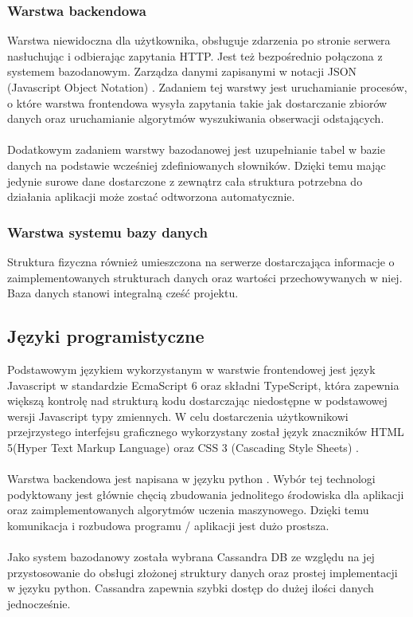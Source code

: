 \documentclass[eng,printmode]{mgr}
\begin{document}
\subsubsection{Warstwa backendowa}
Warstwa niewidoczna dla użytkownika, obsługuje zdarzenia po stronie serwera nasłuchując i odbierając zapytania HTTP. Jest też bezpośrednio połączona z systemem bazodanowym. Zarządza danymi zapisanymi w notacji JSON (Javascript Object Notation) \cite{JSON}. Zadaniem tej warstwy jest uruchamianie procesów, o które warstwa frontendowa wysyła zapytania takie jak dostarczanie zbiorów danych oraz uruchamianie algorytmów wyszukiwania obserwacji odstających.
\\\\
Dodatkowym zadaniem warstwy bazodanowej jest uzupełnianie tabel w bazie danych na podstawie wcześniej zdefiniowanych słowników. Dzięki temu mając jedynie surowe dane dostarczone z zewnątrz cała struktura potrzebna do działania aplikacji może zostać odtworzona automatycznie.
\subsubsection{Warstwa systemu bazy danych}
Struktura fizyczna również umieszczona na serwerze dostarczająca informacje o zaimplementowanych strukturach danych oraz wartości przechowywanych w niej. Baza danych stanowi integralną cześć projektu.
\subsection{Języki programistyczne}
Podstawowym językiem wykorzystanym w warstwie frontendowej jest język Javascript \cite{js} w standardzie EcmaScript 6 \cite{es6} oraz składni TypeScript\cite{ts}, która zapewnia większą kontrolę nad strukturą kodu dostarczając niedostępne w podstawowej wersji Javascript typy zmiennych. W celu dostarczenia użytkownikowi przejrzystego interfejsu graficznego wykorzystany został język znaczników HTML 5(Hyper Text Markup Language)\cite{html} oraz CSS 3 (Cascading Style Sheets) \cite{css}.
\\\\
Warstwa backendowa jest napisana w języku python \cite{python}. Wybór tej technologi podyktowany jest głównie chęcią zbudowania jednolitego środowiska dla aplikacji oraz zaimplementowanych algorytmów uczenia maszynowego. Dzięki temu komunikacja i rozbudowa programu / aplikacji jest dużo prostsza.
\\\\
Jako system bazodanowy została wybrana Cassandra DB \cite{cassandra} ze względu na jej przystosowanie do obsługi złożonej struktury danych oraz prostej implementacji w języku python. Cassandra zapewnia szybki dostęp do dużej ilości danych jednocześnie.
\end{document}
